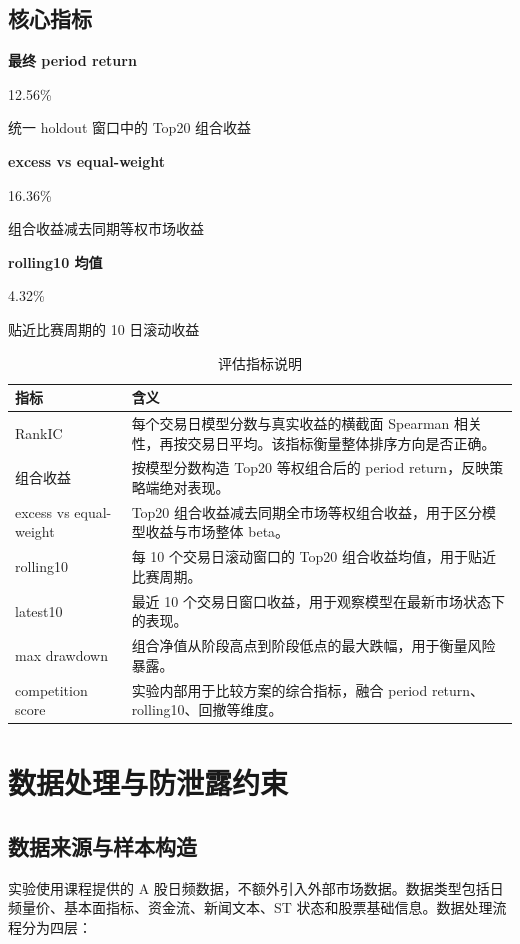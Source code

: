 \documentclass[UTF8,a4paper,12pt,fontset=none]{ctexart}
\newcommand{\metriccard}[3]{%
\begin{minipage}[t]{0.30\textwidth}
\setlength{\parindent}{0pt}
\colorbox{aitSoft}{\parbox{0.94\linewidth}{
\vspace{0.45em}
{\sffamily\bfseries\color{aitInk}#1}\par
\vspace{0.25em}
{\sffamily\fontsize{18}{22}\selectfont\color{aitBlue}#2}\par
\vspace{0.25em}
{\small\color{aitGray}#3}
\vspace{0.45em}
}}
\end{minipage}
}
\begin{document}
\subsection{核心指标}

\begin{center}
\metriccard{最终 period return}{12.56\%}{统一 holdout 窗口中的 Top20 组合收益}
\hfill
\metriccard{excess vs equal-weight}{16.36\%}{组合收益减去同期等权市场收益}
\hfill
\metriccard{rolling10 均值}{4.32\%}{贴近比赛周期的 10 日滚动收益}
\end{center}

\vspace{0.4cm}

\begin{table}[H]
  \centering
  \caption{评估指标说明}
  \label{tab:metric_guide}
  \begin{tabularx}{\textwidth}{L{0.23\textwidth}Y}
    \toprule
    指标 & 含义 \\
    \midrule
    RankIC & 每个交易日模型分数与真实收益的横截面 Spearman 相关性，再按交易日平均。该指标衡量整体排序方向是否正确。 \\
    组合收益 & 按模型分数构造 Top20 等权组合后的 period return，反映策略端绝对表现。 \\
    excess vs equal-weight & Top20 组合收益减去同期全市场等权组合收益，用于区分模型收益与市场整体 beta。 \\
    rolling10 & 每 10 个交易日滚动窗口的 Top20 组合收益均值，用于贴近比赛周期。 \\
    latest10 & 最近 10 个交易日窗口收益，用于观察模型在最新市场状态下的表现。 \\
    max drawdown & 组合净值从阶段高点到阶段低点的最大跌幅，用于衡量风险暴露。 \\
    competition score & 实验内部用于比较方案的综合指标，融合 period return、rolling10、回撤等维度。 \\
    \bottomrule
  \end{tabularx}
\end{table}

\section{数据处理与防泄露约束}

\subsection{数据来源与样本构造}

实验使用课程提供的 A 股日频数据，不额外引入外部市场数据。数据类型包括日频量价、基本面指标、资金流、新闻文本、ST 状态和股票基础信息。数据处理流程分为四层：
\end{document}
